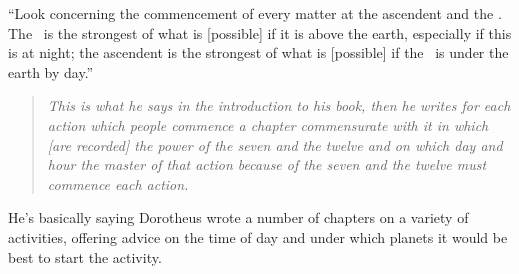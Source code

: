 ``Look  concerning the commencement of every matter at the ascendent and the \Moon. The \Moon\, is the strongest of what is [possible] if it is above the earth, especially if this is at night; the ascendent is the strongest of what is [possible] if the \Moon\, is under the earth by day.''

\begin{quote}
\textsl{This is what he says in the introduction to his book, then he writes for each action which people commence a chapter commensurate with it in which [are recorded] the power of the seven and the twelve and on which day and hour the master of that action because of the seven and the twelve must commence each action.}
\end{quote}

\begin{mdframed}[backgroundcolor=cyan!5, rightmargin=1em, leftmargin=1em]
He's basically saying Dorotheus wrote a number of chapters on a variety of activities, offering advice on the time of day and under which planets it would be best to start the activity.
\end{mdframed}








